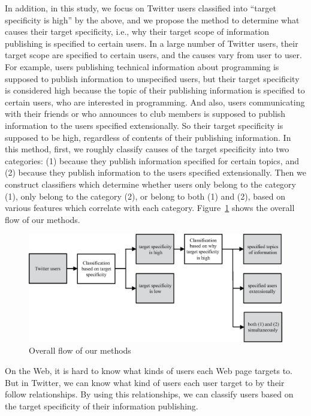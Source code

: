 In addition, in this study, we focus on Twitter users classified into
``target specificity is high'' by the above, and we propose the
method to determine what causes their target specificity, i.e., why
their target scope of information publishing is specified to certain
users.  In a large number of Twitter users, their target scope are
specified to certain users, and the causes vary from user to user.  For
example, users publishing technical information about programming is supposed to
publish information to unspecified users, but their target specificity
is considered high because the topic of their publishing information
is specified to certain users, who are
interested in programming.  And also, users communicating with
their friends or who announces to club members is supposed to publish
information to the users specified
extensionally. So their target specificity is supposed to be high,
regardless of contents of their publishing information.  In this method,
first, we roughly classify causes of the target specificity into two
categories: (1) because they publish information specified for certain
topics, and (2) because they publish information to the users specified
extensionally. Then we construct classifiers which determine
whether users only belong to the category (1), only belong to the category (2),
or belong to both (1) and (2), based on various features which correlate
with each category.  Figure~\ref{fig:Flow} shows the overall flow of our
methods.

{\footnotesize
\begin{figure}[t]
\begin{center}
\includegraphics[width=14cm]{images/flow.eps}
 \caption{Overall flow of our methods}
\label{fig:Flow}
\end{center}
\end{figure}
}

On the Web, it is hard to know what kinds of users each Web page targets
to.  But in Twitter, we can know what kind of users each user target to
by their follow relationships.  By using this relationships, we can
classify users based on the target specificity of their information
publishing.

